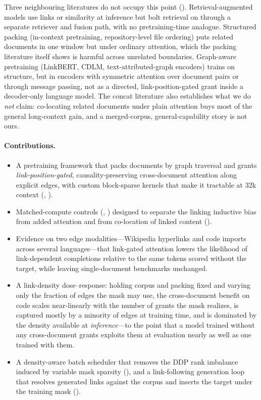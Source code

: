 Three neighbouring literatures do not occupy this point ().
Retrieval-augmented models use links or similarity at inference but bolt retrieval on
through a separate retriever and fusion path, with no pretraining-time analogue.
Structured packing (in-context pretraining, repository-level file ordering) puts
related documents in one window but under ordinary attention, which the packing
literature itself shows is harmful across unrelated boundaries. Graph-aware
pretraining (LinkBERT, CDLM, text-attributed-graph encoders) trains on structure, but
in encoders with symmetric attention over document pairs or through message passing,
not as a directed, link-position-gated grant inside a decoder-only language model. The
concat literature also establishes what we do \emph{not} claim: co-locating related
documents under plain attention buys most of the general long-context gain, and a
merged-corpus, general-capability story is not ours.

\paragraph{Contributions.}
\begin{itemize}
  \item A pretraining framework that packs documents by graph traversal and grants
        \emph{link-position-gated}, causality-preserving cross-document attention along
        explicit edges, with custom block-sparse kernels that make it tractable at $32$k
        context (, ).
  \item Matched-compute controls (\concatlink, \concat) designed to separate the
        linking inductive bias from added attention and from co-location of linked
        content ().
  \item Evidence on two edge modalities---Wikipedia hyperlinks and code imports across
        several languages---that link-gated attention lowers the likelihood of
        link-dependent completions relative to the same tokens scored without the
        target, while leaving single-document benchmarks unchanged.
  \item A link-density dose--response: holding corpus and packing fixed and varying only
        the fraction of edges the mask may use, the cross-document benefit on code scales
        near-linearly with the number of grants the mask realizes, is captured mostly by
        a minority of edges at training time, and is dominated by the density available
        at \emph{inference}---to the point that a model trained without any
        cross-document grants exploits them at evaluation nearly as well as one trained
        with them.
  \item A density-aware batch scheduler that removes the DDP rank imbalance induced by
        variable mask sparsity (), and a link-following
        generation loop that resolves generated links against the corpus and inserts the
        target under the training mask ().
\end{itemize}
